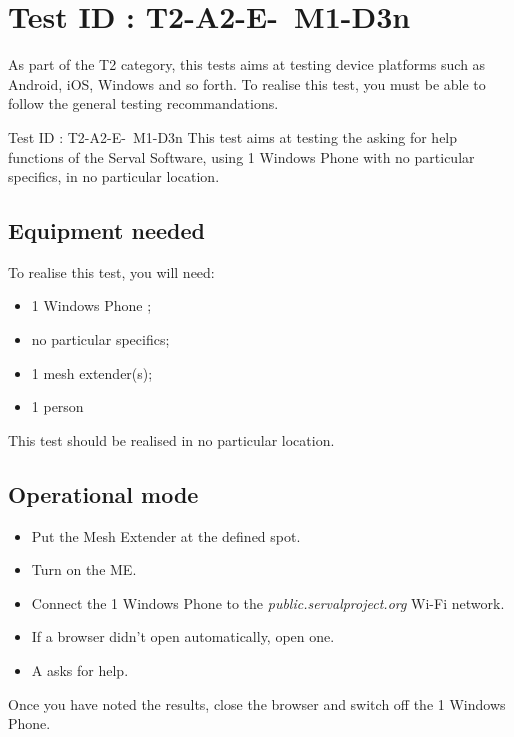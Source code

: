 \documentclass[oneside]{book}
\begin{document}
\section{Test ID : T2-A2-E- M1-D3n}
\begin{itshape}
As part of the T2 category, this tests aims at testing device platforms such as Android, iOS, Windows and so forth.
To realise this test, you must be able to follow the general testing recommandations.
\end{itshape}
\newline
Test ID : T2-A2-E- M1-D3n
 This test aims at testing the asking for help functions of the Serval Software, using 1 Windows Phone with no particular specifics, in no particular location.
\subsection{Equipment needed} To realise this test, you will need:
\begin{itemize}
\item 1 Windows Phone ;
\item no particular specifics;
\item 1 mesh extender(s);
\item 1 person
\end{itemize}
This test should be realised in no particular location.
\subsection{Operational mode} \begin{itemize}
\item Put the Mesh Extender at the defined spot.
\item Turn on the ME.
\item Connect the 1 Windows Phone to the \emph{public.servalproject.org} Wi-Fi network.
\item If a browser didn't open automatically, open one.
\item A asks for help.
\end{itemize}
Once you have noted the results, close the browser and switch off the 1 Windows Phone.
\end{document}
